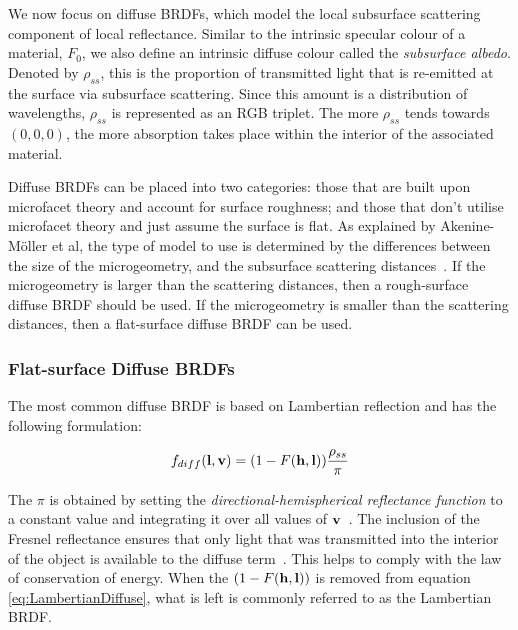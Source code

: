 We now focus on diffuse BRDFs, which model the local subsurface scattering component of local reflectance. Similar to the intrinsic specular colour of a material, \begin{math}F_0\end{math}, we also define an intrinsic diffuse colour called the \textit{subsurface albedo}. Denoted by \begin{math}\rho_{ss}\end{math}, this is the proportion of transmitted light that is re-emitted at the surface via subsurface scattering. Since this amount is a distribution of wavelengths, \begin{math}\rho_{ss}\end{math} is represented as an RGB triplet. The more \begin{math}\rho_{ss}\end{math} tends towards \begin{math}(0, 0, 0)\end{math}, the more absorption takes place within the interior of the associated material.

Diffuse BRDFs can be placed into two categories: those that are built upon microfacet theory and account for surface roughness; and those that don't utilise microfacet theory and just assume the surface is flat. As explained by Akenine-M\"{o}ller et al, the type of model to use is determined by the differences between the size of the microgeometry, and the subsurface scattering distances~\cite{RTR4}. If the microgeometry is larger than the scattering distances, then a rough-surface diffuse BRDF should be used. If the microgeometry is smaller than the scattering distances, then a flat-surface diffuse BRDF can be used.

\subsubsection{Flat-surface Diffuse BRDFs}

The most common diffuse BRDF is based on Lambertian reflection and has the following formulation:

\begin{equation} \label{eq:LambertianDiffuse}
	f_{diff}(\mathbf{l}, \mathbf{v}) = (1 - F(\mathbf{h}, \mathbf{l}))\frac{\rho_{ss}}{\pi}
\end{equation}

The \begin{math}\pi\end{math} is obtained by setting the \textit{directional-hemispherical reflectance function} to a constant value and integrating it over all values of \begin{math}\mathbf{v}\end{math}~\cite{RTR4}. The inclusion of the Fresnel reflectance ensures that only light that was transmitted into the interior of the object is available to the diffuse term~\cite{ShirleySimpleConservationOfEnergy}. This helps to comply with the law of conservation of energy. When the \begin{math}(1 - F(\mathbf{h}, \mathbf{l}))\end{math} is removed from equation \ref{eq:LambertianDiffuse}, what is left is commonly referred to as the Lambertian BRDF.

